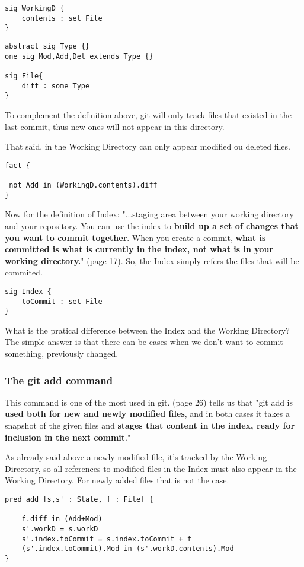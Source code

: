 \begin{lstlisting}
sig WorkingD {
	contents : set File
}
\end{lstlisting}

\begin{lstlisting}
abstract sig Type {}
one sig Mod,Add,Del extends Type {}

sig File{
	diff : some Type	
}
\end{lstlisting}

To complement the definition above, git will only
track files that existed in the last commit, thus
new ones will not appear in this directory. \par 
That said, in the Working Directory can only appear
modified ou deleted files. \par

\begin{lstlisting}
fact {

 not Add in (WorkingD.contents).diff
}
\end{lstlisting}

Now for the definition of Index:
"...staging area between your working directory and your
repository. You can use the index to {\bf build up a set of 
changes that you want to commit together}. When you create
a commit, {\bf what is committed is what is currently in the
index, not what is in your working directory.}"
\cite{gitComm} (page 17). So, the Index simply refers the files
that will be commited.

\begin{lstlisting}
sig Index {
	toCommit : set File
}
\end{lstlisting}

What is the pratical difference between the Index and the Working
Directory? The simple answer is that there can be cases when we don't want
to commit something, previously changed.

\subsubsection{The git add command}

This command is one of the most used in git. \cite{gitComm} (page 26)
tells us that
"git add is {\bf used both for new and newly modified files},
and in both cases it takes a snapshot of the given files
and {\bf stages that content in the index, ready for inclusion
in the next commit}." \par 
As already said above a newly modified file, it's tracked by
the Working Directory, so all references to modified files in
the Index must also appear in the Working Directory. For newly
added files that is not the case.
\begin{lstlisting}
pred add [s,s' : State, f : File] {
  
    f.diff in (Add+Mod) 
    s'.workD = s.workD
    s'.index.toCommit = s.index.toCommit + f 
    (s'.index.toCommit).Mod in (s'.workD.contents).Mod
}

\end{lstlisting}

